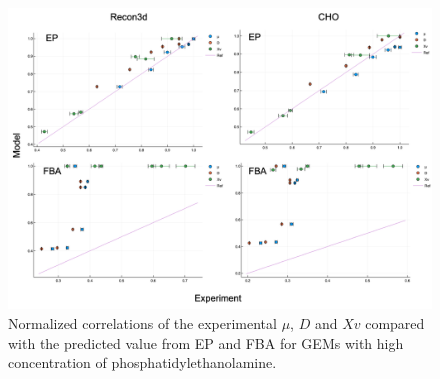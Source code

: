 	\begin{figure}[h]
		\includegraphics[scale = 0.5]{rich_medium_3}
		\caption{Normalized correlations of the experimental $\mu$, $D$ and $Xv$ compared with the predicted value from EP and FBA for GEMs with high concentration of phosphatidylethanolamine.}
		
	\end{figure}